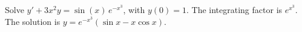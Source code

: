 {Solve $y' + 3x^2y = \sin(x) \, e^{-x^3}$, with $y(0) = 1$.}
{The integrating factor is $e^{x^3}$.\\
The solution is $y=e^{-x^3}(\sin x-x\cos x)$.}